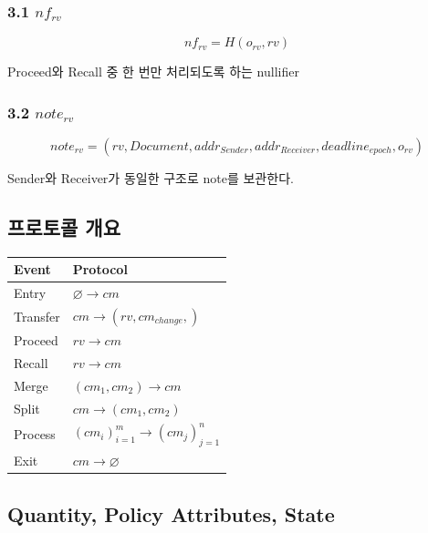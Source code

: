 \documentclass[11pt,a4paper]{extarticle}
\begin{document}
\subsubsection*{3.1 \(nf_{rv}\)}

\[
  nf_{rv}=H(o_{rv},rv)
\]

Proceed와 Recall 중 한 번만 처리되도록 하는 nullifier

\subsubsection*{3.2 \(note_{rv}\)}

\[
  note_{rv}
  =
  (
  rv,
  \mathit{Document},
  addr_{Sender},
  addr_{Receiver},
  deadline_{epoch},
  o_{rv}
  )
\]

Sender와 Receiver가 동일한 구조로 note를 보관한다.

\subsection{프로토콜 개요}

\begin{center}
  \begin{tabular}{ll}
    \hline
    Event    & Protocol                                          \\
    \hline
    Entry    & $\varnothing\rightarrow cm$                       \\
    Transfer & $cm\rightarrow (rv, cm_{change},)$                \\
    Proceed  & $rv\rightarrow cm$                                \\
    Recall   & $rv\rightarrow cm$                                \\
    Merge    & $(cm_{1},cm_{2})\rightarrow cm$                   \\
    Split    & $cm\rightarrow (cm_{1},cm_{2})$                   \\
    Process  & $(cm_{i})_{i=1}^{m}\rightarrow(cm_{j})_{j=1}^{n}$ \\
    Exit     & $cm\rightarrow\varnothing$                        \\
    \hline
  \end{tabular}
\end{center}

\subsection{Quantity, Policy Attributes, State}
\end{document}
